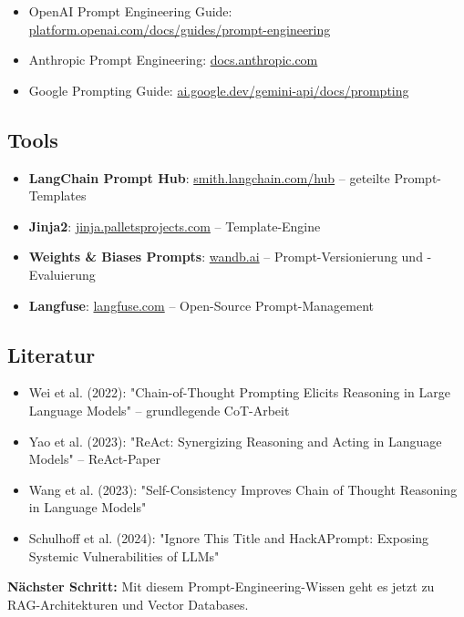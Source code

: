 \begin{itemize}[leftmargin=*]
    \item OpenAI Prompt Engineering Guide: \href{https://platform.openai.com/docs/guides/prompt-engineering}{platform.openai.com/docs/guides/prompt-engineering}
    \item Anthropic Prompt Engineering: \href{https://docs.anthropic.com/en/docs/build-with-claude/prompt-engineering}{docs.anthropic.com}
    \item Google Prompting Guide: \href{https://ai.google.dev/gemini-api/docs/prompting}{ai.google.dev/gemini-api/docs/prompting}
\end{itemize}

\subsection{Tools}

\begin{itemize}[leftmargin=*]
    \item \textbf{LangChain Prompt Hub}: \href{https://smith.langchain.com/hub}{smith.langchain.com/hub} -- geteilte Prompt-Templates
    \item \textbf{Jinja2}: \href{https://jinja.palletsprojects.com}{jinja.palletsprojects.com} -- Template-Engine
    \item \textbf{Weights \& Biases Prompts}: \href{https://wandb.ai}{wandb.ai} -- Prompt-Versionierung und -Evaluierung
    \item \textbf{Langfuse}: \href{https://langfuse.com}{langfuse.com} -- Open-Source Prompt-Management
\end{itemize}

\subsection{Literatur}

\begin{itemize}[leftmargin=*]
    \item Wei et al. (2022): "Chain-of-Thought Prompting Elicits Reasoning in Large Language Models" -- grundlegende CoT-Arbeit
    \item Yao et al. (2023): "ReAct: Synergizing Reasoning and Acting in Language Models" -- ReAct-Paper
    \item Wang et al. (2023): "Self-Consistency Improves Chain of Thought Reasoning in Language Models"
    \item Schulhoff et al. (2024): "Ignore This Title and HackAPrompt: Exposing Systemic Vulnerabilities of LLMs"
\end{itemize}

\textbf{Nächster Schritt:} Mit diesem Prompt-Engineering-Wissen geht es jetzt zu RAG-Architekturen und Vector Databases.
